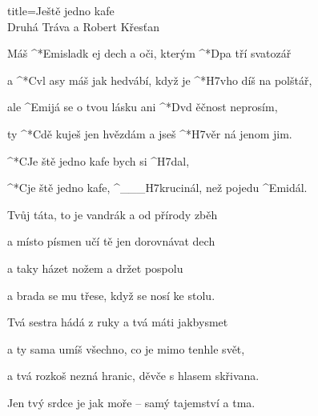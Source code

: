 \begin{song}{title=\predtitle\centering Ještě jedno kafe  \\\large Druhá Tráva a Robert Křesťan  \vspace*{-0.3cm}}  %
\begin{centerjustified}
\nejnejvetsi

\sloka 
	Máš ^*{Emi}sladk ej dech a oči, kterým ^*{D}pa tří svatozář

	a ^*{C}vl asy máš jak hedvábí, když je ^*{H7}vho díš na polštář,

	ale ^{Emi}já se o tvou lásku ani ^*{D}vd ěčnost neprosím,

	ty ^*{C}dě kuješ jen hvězdám a jseš ^*{H7}věr ná jenom jim.

	^*{C}Je ště jedno kafe bych si ^{H7}dal,

	^*{C}je ště jedno kafe, ^{{\color{white}\_\_\_}H7}krucinál, než pojedu ^{Emi}dál.

\sloka
	Tvůj táta, to je vandrák a od přírody zběh
	
	a místo písmen učí tě jen dorovnávat dech
	
	a taky házet nožem a držet pospolu
   
	a brada se mu třese, když se nosí ke stolu.



\sloka
	Tvá sestra hádá z ruky a tvá máti jakbysmet
	
	a ty sama umíš všechno, co je mimo tenhle svět,
	
	a tvá rozkoš nezná hranic, děvče s hlasem skřivana.
	
	Jen tvý srdce je jak moře -- samý tajemství a tma.


\centering
{}

\end{centerjustified}
\setcounter{Slokočet}{0}
\end{song}
